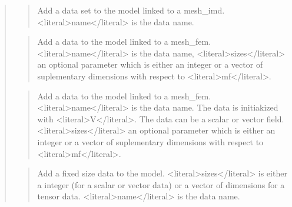 \documentclass[a4paper,11pt,english]{sphinxmanual}
\begin{document}
\begin{quote}
\sphinxAtStartPar
{}
\begin{quote}

\sphinxAtStartPar
Add a data set to the model linked to a mesh\_imd. \textless{}literal\textgreater{}name\textless{}/literal\textgreater{} is the data
name.
\end{quote}

\sphinxAtStartPar
{}
\begin{quote}

\sphinxAtStartPar
Add a data to the model linked to a mesh\_fem. \textless{}literal\textgreater{}name\textless{}/literal\textgreater{} is the data name,
\textless{}literal\textgreater{}sizes\textless{}/literal\textgreater{} an optional parameter which is either an
integer  or a vector of suplementary dimensions with respect to \textless{}literal\textgreater{}mf\textless{}/literal\textgreater{}.
\end{quote}

\sphinxAtStartPar
{}
\begin{quote}

\sphinxAtStartPar
Add a data to the model linked to a mesh\_fem. \textless{}literal\textgreater{}name\textless{}/literal\textgreater{} is the data name.
The data is initiakized with \textless{}literal\textgreater{}V\textless{}/literal\textgreater{}. The data can be a scalar or vector
field. \textless{}literal\textgreater{}sizes\textless{}/literal\textgreater{} an optional parameter which is either an
integer or a vector of suplementary dimensions with respect to \textless{}literal\textgreater{}mf\textless{}/literal\textgreater{}.
\end{quote}

\sphinxAtStartPar
{}
\begin{quote}

\sphinxAtStartPar
Add a fixed size data to the model.  \textless{}literal\textgreater{}sizes\textless{}/literal\textgreater{} is either a
integer (for a scalar or vector data) or a vector of dimensions
for a tensor data. \textless{}literal\textgreater{}name\textless{}/literal\textgreater{} is the data name.
\end{quote}


\end{quote}
\end{document}
